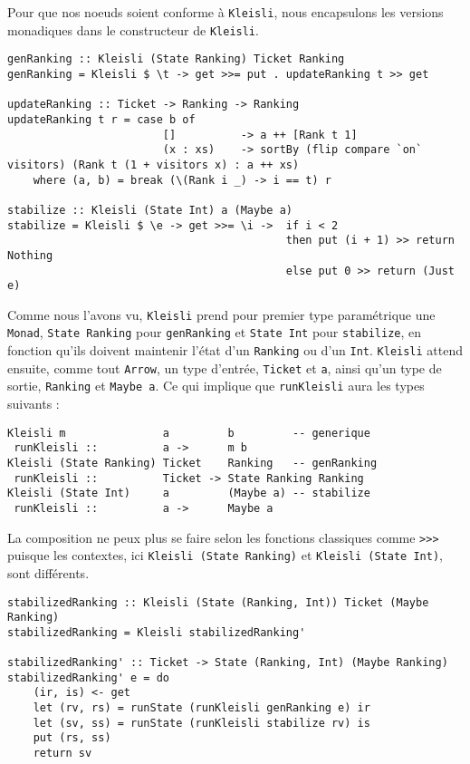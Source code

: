 \documentclass{llncs}
\begin{document}
Pour que nos noeuds soient conforme à \lstinline{Kleisli}, nous encapsulons les
versions monadiques dans le constructeur de \lstinline{Kleisli}.
\begin{lstlisting}
genRanking :: Kleisli (State Ranking) Ticket Ranking
genRanking = Kleisli $ \t -> get >>= put . updateRanking t >> get

updateRanking :: Ticket -> Ranking -> Ranking
updateRanking t r = case b of
                        []          -> a ++ [Rank t 1]
                        (x : xs)    -> sortBy (flip compare `on` visitors) (Rank t (1 + visitors x) : a ++ xs)
    where (a, b) = break (\(Rank i _) -> i == t) r

stabilize :: Kleisli (State Int) a (Maybe a)
stabilize = Kleisli $ \e -> get >>= \i ->  if i < 2
                                           then put (i + 1) >> return Nothing
                                           else put 0 >> return (Just e)
\end{lstlisting}
Comme nous l'avons vu, \lstinline{Kleisli} prend pour premier type paramétrique
une \lstinline{Monad}, \lstinline{State Ranking} pour \lstinline{genRanking} et
\lstinline{State Int} pour \lstinline{stabilize}, en fonction qu'ils doivent
maintenir l'état d'un \lstinline{Ranking} ou d'un \lstinline{Int}.
\lstinline{Kleisli} attend ensuite, comme tout \lstinline{Arrow}, un type d'entrée,
\lstinline{Ticket} et \lstinline{a}, ainsi qu'un type de sortie, \lstinline{Ranking}
et \lstinline{Maybe a}.
Ce qui implique que \lstinline{runKleisli} aura les types suivants :
\begin{lstlisting}
Kleisli m               a         b         -- generique
 runKleisli ::          a ->      m b
Kleisli (State Ranking) Ticket    Ranking   -- genRanking
 runKleisli ::          Ticket -> State Ranking Ranking
Kleisli (State Int)     a         (Maybe a) -- stabilize
 runKleisli ::          a ->      Maybe a
\end{lstlisting}

La composition ne peux plus se faire selon les fonctions classiques comme \lstinline{>>>}
puisque les contextes, ici \lstinline{Kleisli (State Ranking)} et \lstinline{Kleisli (State Int)},
sont différents.

\begin{lstlisting}
stabilizedRanking :: Kleisli (State (Ranking, Int)) Ticket (Maybe Ranking)
stabilizedRanking = Kleisli stabilizedRanking'

stabilizedRanking' :: Ticket -> State (Ranking, Int) (Maybe Ranking)
stabilizedRanking' e = do
    (ir, is) <- get
    let (rv, rs) = runState (runKleisli genRanking e) ir
    let (sv, ss) = runState (runKleisli stabilize rv) is
    put (rs, ss)
    return sv
\end{lstlisting}
\end{document}
